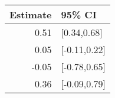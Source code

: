 \begin{tabular}{rl}
  \hline
Estimate & 95\% CI \\ 
  \hline
0.51 & [0.34,0.68] \\ 
  0.05 & [-0.11,0.22] \\ 
  -0.05 & [-0.78,0.65] \\ 
  0.36 & [-0.09,0.79] \\ 
   \hline
\end{tabular}

